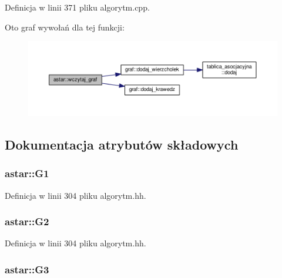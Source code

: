 Definicja w linii 371 pliku algorytm.\-cpp.



Oto graf wywołań dla tej funkcji\-:\nopagebreak
\begin{figure}[H]
\begin{center}
\leavevmode
\includegraphics[width=350pt]{classastar_a49a57d782d6c8e45d52b8172de9599c3_cgraph}
\end{center}
\end{figure}




\subsection{Dokumentacja atrybutów składowych}
\hypertarget{classastar_a21539dac3fd18df6e15afc7c83d89427}{
\subsubsection[{G1}]{ astar\-::\-G1\hspace{0.3cm}{\ttfamily [private]}}}\label{classastar_a21539dac3fd18df6e15afc7c83d89427}


Definicja w linii 304 pliku algorytm.\-hh.

\hypertarget{classastar_aa835235b087f6ad57c96c1a7a94d2a62}{
\subsubsection[{G2}]{ astar\-::\-G2\hspace{0.3cm}{\ttfamily [private]}}}\label{classastar_aa835235b087f6ad57c96c1a7a94d2a62}


Definicja w linii 304 pliku algorytm.\-hh.

\hypertarget{classastar_a06c4202ba38c3eecf189388cf06b9b80}{
\subsubsection[{G3}]{ astar\-::\-G3\hspace{0.3cm}{\ttfamily [private]}}}\label{classastar_a06c4202ba38c3eecf189388cf06b9b80}


